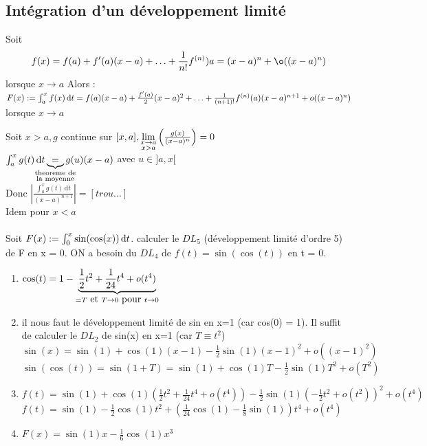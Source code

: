 \documentclass[12pt,a4paper]{article}
\begin{document}
{\subsection{Intégration d'un développement limité}
\begin{boite}
 Soit
\begin{equation}
	f(x) = f(a) + f'(a)(x-a) + \ldots + \frac{1}{n!}f^{(n)})a=(x-a)^n + \o((x-a)^n)
\end{equation}
lorsque $x\to a$ Alors :\\
$F(x) := \int_a^x f(x) \, \mathrm dt \\
= f(a)(x-a) + \frac{f'(a)}{2}(x-a)^2 + \ldots +\frac{1}{(n+1)!}f^{(n)}(a) (x-a)^{n+1} + o((x-a)^n)$\\
lorsque $x\to a$
\end{boite}
Soit $x > a, g$ continue sur $[x,a], \lim\limits_{\substack{x\to a \\ x>a}}\left(\frac{g(x)}{(x-a)^n}\right) = 0$\\
$\int_a^x g(t) \, \mathrm dt \underbrace{=}_{\mathclap{\substack{\text{theoreme de}\\\text{la moyenne}}}} g(u)(x-a)$ avec $u \in ]a,x[$\\
Donc $\left| \frac{\int_a^xg(t)\, \mathrm dt}{(x-a)^{n+1}}\right| = [trou...]$\\
Idem pour $x<a$\\
\\
Soit $F(x) := \int_{0}^{x} \sin(\cos(x)) \, \mathrm d t$. calculer le $DL_5$ (développement limité d'ordre 5) de F en x = 0. ON a besoin du $DL_4$ de $f(t) = \sin(\cos(t))$ en t = 0.
\begin{enumerate}[label=\roman*)]
	\item $\cos(t) = 1- \underbrace{ \frac{1}{2}t^2 + \frac{1}{24} t^4 + o(t^4)}_{=T\mbox{ et }T \to 0 \mbox{ pour } t \to 0}$
	\item il nous faut le développement limité de sin en x=1 (car cos(0) = 1). Il suffit de calculer le $DL_2$ de sin(x) en x=1 (car $T \equiv t^2$)\\
	$\sin(x) = \sin(1) + \cos(1)(x-1) - \frac{1}{2}\sin(1)(x-1)^2 + o((x-1)^2)$\\
	$\sin(\cos(t)) = \sin(1+T) = \sin(1)+\cos(1)T - \frac{1}{2}\sin(1)T^2 + o(T^2)$
	\item $f(t) = \sin(1) +  \cos(1)(\frac{1}{2}t^2 + \frac{1}{24}t^4 + o(t^4)) - \frac{1}{2}\sin(1)(-\frac{1}{2}t^2 + o(t^2))^2 + o(t^4)$\\
	$f(t) =  \sin(1) - \frac{1}{2} \cos(1)t^2 + (\frac{1}{24}\cos(1) - \frac{1}{8} \sin(1))t^4 + o(t^4)$
	\item $F(x) = \sin(1)x - \frac{1}{6} \cos(1)x^3$
\end{enumerate}
}
\end{document}
